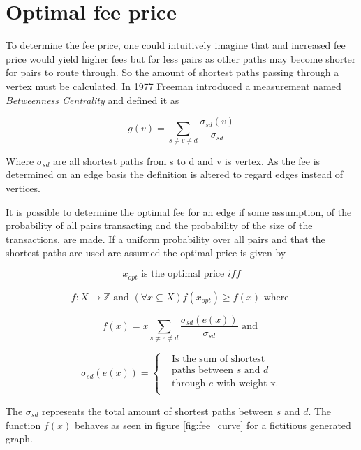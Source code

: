 \section{Optimal fee price}

To determine the fee price, one could intuitively imagine that and increased fee price would yield higher fees but for less pairs as other paths may become shorter for pairs to route through. So the amount of shortest paths passing through a vertex must be calculated. In 1977 Freeman introduced a measurement named \textit{Betweenness Centrality}\cite{freeman:betweenness:centrality} and defined it as

\[ g(v) = \sum_{s \neq v \neq d}\frac{\sigma_{sd}(v)}{\sigma_{sd}} \]

Where $\sigma_{sd}$ are all shortest paths from s to d and v is vertex. As the fee is determined on an edge basis the definition is altered to regard edges instead of vertices. 

It is possible to determine the optimal fee for an edge if some assumption, of the probability of all pairs transacting and the probability of the size of the transactions, are made. If a uniform probability over all pairs and that the shortest paths are used are assumed the optimal price is given by

\[ x_{opt} \textrm{ is the optimal price } iff \]

\[ f: X \to \mathbb{Z} \textrm{ and } (\forall x \subseteq X)f(x_{opt}) \geqslant f(x) \textrm{ where }\]

\[ f(x) = x\sum_{s \neq e \neq d}\frac{\sigma_{sd}(e(x))}{\sigma_{sd}} \textrm{ and } \]


\[ \sigma_{sd}(e(x)) =  \begin{cases}
 & \text{Is the sum of shortest } \\
 & \text{paths between $s$ and $d$} \\
& \text{through $e$ with weight x.} \\

\end{cases} \]


The $\sigma_{sd}$ represents the total amount of shortest paths between $s$ and $d$.
The function $f(x)$ behaves as seen in figure \ref{fig:fee_curve} for a fictitious generated graph. 

